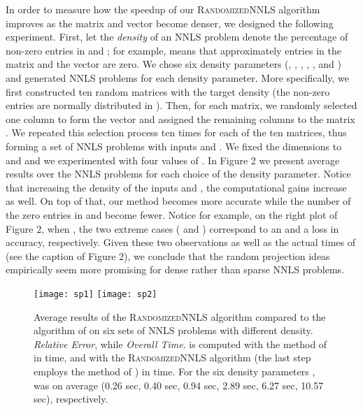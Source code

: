 \documentclass[11pt]{article}
\begin{document}
In order to measure how the speedup of our \textsc{RandomizedNNLS}
algorithm improves as the matrix  and vector  become denser,
we designed the following experiment. First, let the
\textit{density} of an NNLS problem denote the percentage of
non-zero entries in  and ; for example,  means that approximately  entries in the  matrix  and the  vector  are zero. We
chose six density parameters (, , , , ,
and ) and generated  NNLS problems for each density
parameter. More specifically, we first constructed ten  random matrices with the target density (the non-zero
entries are normally distributed in ). Then, for each
matrix, we randomly selected one column to form the vector  and
assigned the remaining  columns to the matrix . We repeated
this selection process ten times for each of the ten  matrices, thus forming a set of  NNLS problems with
inputs  and . We fixed the dimensions to  and
 and we experimented with four values of . In Figure 2 we present average results over the
 NNLS problems for each choice of the density parameter.
Notice that increasing the density of the inputs  and , the
computational gains increase as well. On top of that, our method
becomes more accurate while the number of the zero entries in 
and  become fewer. Notice for example, on the right plot of
Figure 2, when , the two extreme cases ( and ) correspond to an  and a  loss in
accuracy, respectively. Given these two observations as well as
the actual times of  (see the caption of Figure 2),
we conclude that the random projection ideas empirically seem more
promising for dense rather than sparse NNLS problems.


\begin{figure}
\label{fig:results2}
    \begin{center}
    \texttt{[image: sp1]}
    \texttt{[image: sp2]}
    \end{center}
    \caption{
    Average results of the \textsc{RandomizedNNLS}
    algorithm compared to the algorithm of \cite{KSD07} on six sets of  NNLS
    problems with different density.
    \emph{Relative Error}, while \emph{Overall Time}.  is computed with the method of \cite{KSD07} in
     time, and   with the \textsc{RandomizedNNLS} algorithm (the last step employs the method of \cite{KSD07}) in
     time. For the six density parameters ,  was on average (0.26 sec, 0.40 sec, 0.94 sec,
    2.89 sec, 6.27 sec, 10.57 sec), respectively.    }
\end{figure}
\end{document}
